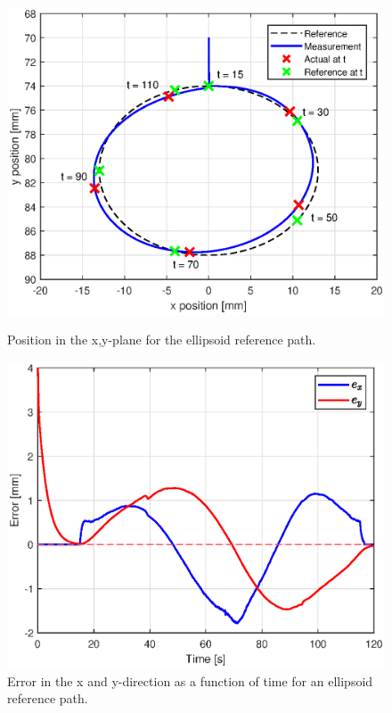 \begin{figure}[H] 
    \begin{minipage}[b]{0.49\linewidth}
     \centering
    \includegraphics[width=\linewidth]{Figures/Chapter5/ellipsxy.eps} 
    \caption{Position in the x,y-plane for the ellipsoid reference path. } 
    \label{app5:xysim} 
       \end{minipage} 
    \begin{minipage}[b]{0.49\linewidth}
     \centering
    \includegraphics[width=\linewidth]{Figures/Chapter5/errorellips.eps} 
    \caption{Error in the x and y-direction as a function of time for an ellipsoid reference path.} 
    \label{app5:errorxyellipssim} 
    \end{minipage} 
\end{figure}

